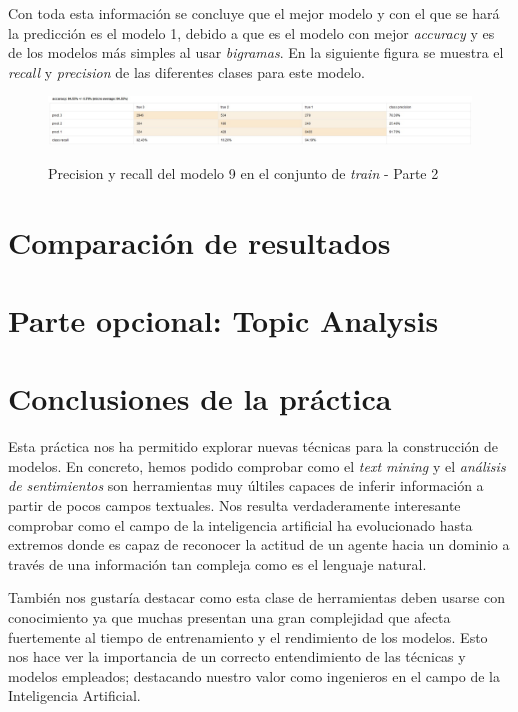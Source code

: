 \documentclass[es]{uc3mreport}
\begin{document}
\begin{report}
    Con toda esta información se concluye que el mejor modelo y con el que se
    hará la predicción es el modelo 1, debido a que es el modelo con mejor
    \textit{accuracy} y es de los modelos más simples al usar \textit{bigramas}.
    En la siguiente figura se muestra el \textit{recall} y \textit{precision} de
    las diferentes clases para este modelo.

    \begin{figure}[H]
        \center
        \includegraphics[width=\linewidth]{train2.jpeg}\\
        \caption{Precision y recall del modelo 9 en el conjunto de \textit{train} - Parte 2}
    \end{figure}


\section{Comparación de resultados}
\label{chap:resultados}


\section{Parte opcional: Topic Analysis}
\label{chap:topic}

\section{Conclusiones de la práctica}
\label{chap:conclusion}

Esta práctica nos ha permitido explorar nuevas técnicas para la construcción de modelos. En concreto, hemos podido comprobar como el \textit{text mining} y el \textit{análisis de sentimientos} son herramientas muy últiles capaces de inferir información a partir de pocos campos textuales. Nos resulta verdaderamente interesante comprobar como el campo de la inteligencia artificial ha evolucionado hasta extremos donde es capaz de reconocer la actitud de un agente hacia un dominio a través de una información tan compleja como es el lenguaje natural.

También nos gustaría destacar como esta clase de herramientas deben usarse con conocimiento ya que muchas presentan una gran complejidad que afecta fuertemente al tiempo de entrenamiento y el rendimiento de los modelos. Esto nos hace ver la importancia de un correcto entendimiento de las técnicas y modelos empleados; destacando nuestro valor como ingenieros en el campo de la Inteligencia Artificial.

  \end{report}
\end{document}
